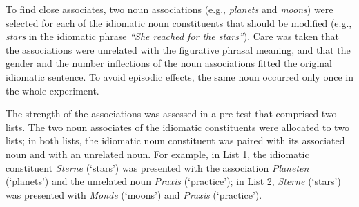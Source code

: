 \documentclass[output=paper]{langsci/langscibook}
\begin{document}
\begin{table}
\caption{Idiomatic sentences and stimulus characteristics of the idiomatic, modified, and unrelated noun constituents in Experiment 1. \textit{Note.} N = number of items, Lemma = mean lemma frequency per one million, taken from CELEX \citep{baayen:1993}, Closure = mean sentence completion in \%.\label{tab:stimulus}}
\end{table}


To find close associates, two noun associations (e.g., \textit{planets} and \textit{moons}) were selected for each of the idiomatic noun constituents that should be modified (e.g., \textit{stars} in the idiomatic phrase \textit{``She reached for the stars''}). Care was taken that the associations were unrelated with the figurative phrasal meaning, and that the gender and the number inflections of the noun associations fitted the original idiomatic sentence. To avoid episodic effects, the same noun occurred only once in the whole experiment.

The strength of the associations was assessed in a pre-test that comprised two lists. The two noun associates of the idiomatic constituents were allocated to two lists; in both lists, the idiomatic noun constituent was paired with its associated noun and with an unrelated noun.  For example, in List 1, the idiomatic constituent \textit{Sterne} (‘stars’) was presented with the association \textit{Planeten} (‘planets’) and the unrelated noun \textit{Praxis} (‘practice’); in List 2, \textit{Sterne} (‘stars’) was presented with \textit{Monde} (‘moons’) and \textit{Praxis} (‘practice’).
\end{document}

